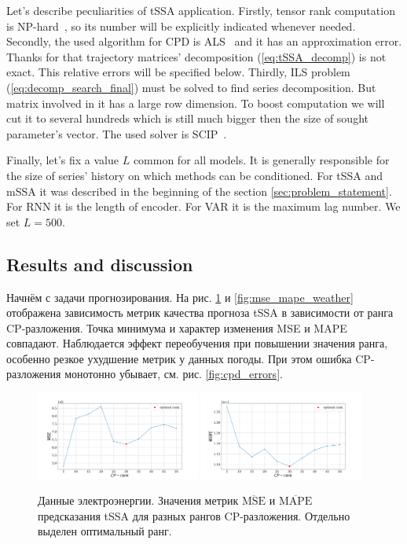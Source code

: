 	Let's describe peculiarities of tSSA application. Firstly, tensor rank computation is NP-hard~\cite{HASTAD1990644}, so its number will be explicitly indicated whenever needed. Secondly, the used algorithm for CPD is ALS~\cite{kolda_tensors} and it has an approximation error. Thanks for that trajectory matrices' decomposition (\ref{eq:tSSA_decomp}) is not exact. This relative errors will be specified below. Thirdly, ILS problem (\ref{eq:decomp_search_final}) must be solved to find series decomposition. But matrix involved in it has a large row dimension. To boost computation we will cut it to several hundreds which is still much bigger then the size of sought parameter's vector. The used solver is SCIP~\cite{BolusaniEtal2024ZR}.

	Finally, let's fix a value $ L $ common for all models. It is generally responsible for the size of series' history on which methods can be conditioned. For tSSA and mSSA it was described in the beginning of the section \ref{sec:problem_statement}. For RNN it is the length of encoder. For VAR it is the maximum lag number. We set $ L = 500 $.
	
	\subsection*{Results and discussion}
	
	Начнём с задачи прогнозирования. На рис. \ref{fig:mse_mape_electr} и \ref{fig:mse_mape_weather} отображена зависимость метрик качества прогноза tSSA в зависимости от ранга CP-разложения. Точка минимума и характер изменения MSE и MAPE совпадают. Наблюдается эффект переобучения при повышении значения ранга, особенно резкое ухудшение метрик у данных погоды. При этом ошибка CP-разложения монотонно убывает, см. рис. \ref{fig:cpd_errors}.
	
	\begin{figure}[h]
		\centering
		\includegraphics[width=0.48\textwidth, keepaspectratio]{../../experiments/electricity/tssa/figs/prediction/MSE_rank.png}
		\includegraphics[width=0.48\textwidth, keepaspectratio]{../../experiments/electricity/tssa/figs/prediction/MAPE_rank.png}
		\caption{Данные электроэнергии. Значения метрик $ \overline{\text{MSE}} $ и $ \overline{\text{MAPE}} $ предсказания tSSA для разных рангов CP-разложения. Отдельно выделен оптимальный ранг.}\label{fig:mse_mape_electr}
	\end{figure}
	
